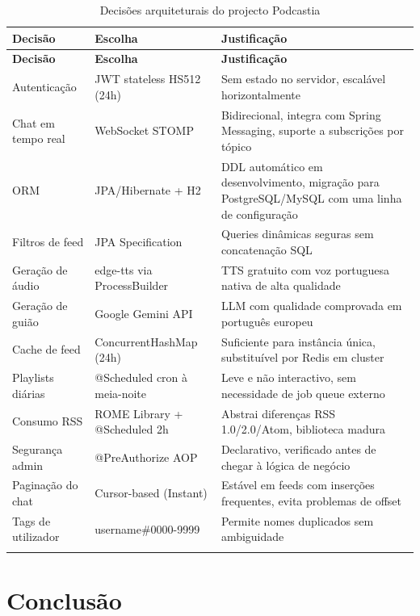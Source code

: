 \documentclass[12pt, a4paper]{report}
\begin{document}
\begin{longtable}{L{3.5cm} L{3cm} L{7cm}}
  \toprule
  \textbf{Decisão} & \textbf{Escolha} & \textbf{Justificação} \\
  \midrule
  \endfirsthead
  \toprule
  \textbf{Decisão} & \textbf{Escolha} & \textbf{Justificação} \\
  \midrule
  \endhead
  Autenticação         & JWT stateless HS512 (24h)       & Sem estado no servidor, escalável horizontalmente \\
  Chat em tempo real   & WebSocket STOMP                 & Bidirecional, integra com Spring Messaging, suporte a subscrições por tópico \\
  ORM                  & JPA/Hibernate + H2              & DDL automático em desenvolvimento, migração para PostgreSQL/MySQL com uma linha de configuração \\
  Filtros de feed      & JPA Specification               & Queries dinâmicas seguras sem concatenação SQL \\
  Geração de áudio     & edge-tts via ProcessBuilder     & TTS gratuito com voz portuguesa nativa de alta qualidade \\
  Geração de guião     & Google Gemini API               & LLM com qualidade comprovada em português europeu \\
  Cache de feed        & ConcurrentHashMap (24h)         & Suficiente para instância única, substituível por Redis em cluster \\
  Playlists diárias    & @Scheduled cron à meia-noite    & Leve e não interactivo, sem necessidade de job queue externo \\
  Consumo RSS          & ROME Library + @Scheduled 2h    & Abstrai diferenças RSS\,1.0/2.0/Atom, biblioteca madura \\
  Segurança admin      & @PreAuthorize AOP               & Declarativo, verificado antes de chegar à lógica de negócio \\
  Paginação do chat    & Cursor-based (Instant)          & Estável em feeds com inserções frequentes, evita problemas de offset \\
  Tags de utilizador   & username\#0000-9999             & Permite nomes duplicados sem ambiguidade \\
  \bottomrule
  \caption{Decisões arquiteturais do projecto Podcastia}
\end{longtable}

\chapter{Conclusão}
\label{chap:conclusao}
\end{document}
